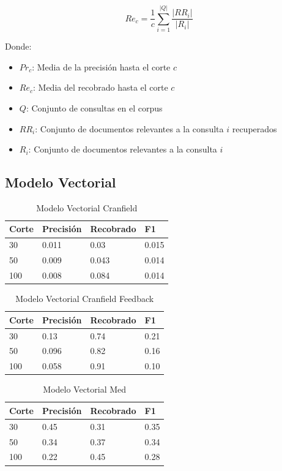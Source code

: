 \documentclass[runningheads]{llncs}
\begin{document}
\begin{equation}
Re_c = \frac{1}{c} \sum_{i=1}^{|Q|} \frac{|RR_i|}{|R_i|}
\end{equation}

Donde:

\begin{itemize}

	\item $Pr_c$: Media de la precisión hasta el corte $c$
	\item $Re_c$: Media del recobrado hasta el corte $c$
	\item $Q$: Conjunto de consultas en el corpus
	\item $RR_i$: Conjunto de documentos relevantes a la consulta $i$ recuperados
	\item $R_i$: Conjunto de documentos relevantes a la consulta $i$

\end{itemize}

\newpage

\subsection{Modelo Vectorial}

\begin{table}
	\caption{Modelo Vectorial Cranfield}\label{cran_vec_result}
 \begin{tabular}{|l|l|l|l|}
 \hline
 	Corte &  Precisión & Recobrado & F1\\
 \hline
	30 & 0.011 & 0.03 & 0.015\\
	50 & 0.009 & 0.043 & 0.014\\
	100 & 0.008 & 0.084 & 0.014\\
 \hline
 \end{tabular}
\end{table}


\begin{table}
	\caption{Modelo Vectorial Cranfield Feedback}\label{cran_vec_feed_result}
 \begin{tabular}{|l|l|l|l|}
 \hline
 	Corte &  Precisión & Recobrado & F1\\
 \hline
	30 & 0.13 & 0.74 & 0.21\\
	50 & 0.096 & 0.82 & 0.16\\
	100 & 0.058 & 0.91 & 0.10\\
 \hline
 \end{tabular}
\end{table}


\begin{table}
	\caption{Modelo Vectorial Med}\label{med_vec_result}
 \begin{tabular}{|l|l|l|l|}
 \hline
 	Corte &  Precisión & Recobrado & F1\\
 \hline
	30 & 0.45 & 0.31 & 0.35\\
	50 & 0.34 & 0.37 & 0.34\\
	100 & 0.22 & 0.45 & 0.28\\
 \hline
 \end{tabular}
\end{table}
\end{document}
